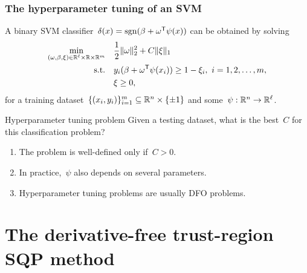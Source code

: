 \documentclass{polyu-presentation}  %
\begin{document}
\begin{frame}
    \frametitle{The hyperparameter tuning of an SVM}

    A \alert{binary SVM classifier}~$\delta(x) = \operatorname{sgn}(\beta + \omega^{\mathsf{T}} \psi(x))$ can be obtained by solving
    \begin{align*}
        \min_{(\omega, \beta, \xi) \in \mathbb{R}^{\ell} \times \mathbb{R} \times \mathbb{R}^m} & \quad\frac{1}{2} \lVert\omega\rVert_2^2 + C \lVert\xi\rVert_1\\
        \text{s.t.}                                                     & \quad y_i (\beta + \omega^{\mathsf{T}} \psi(x_i)) \ge 1 - \xi_i, ~ i = 1, 2, \dots, m,\\
                                                                        & \quad \xi \ge 0,
    \end{align*}
    for a \alert{training dataset}~$\{(x_i, y_i)\}_{i = 1}^m \subseteq \mathbb{R}^n \times \{\pm 1\}$ and some~$\psi : \mathbb{R}^n \to \mathbb{R}^{\ell}$.

    \medskip

    \begin{block}{Hyperparameter tuning problem}
        Given a \alert{testing dataset}, what is the \alert{best}~$C$ for this classification problem?
        \begin{enumerate}[<+(1)->]
            \item The problem is well-defined \alert{only if}~$C > 0$.
            \item In practice,~$\psi$ also depends on several \alert{parameters}.
            \item Hyperparameter tuning problems are usually \alert{DFO problems}.
        \end{enumerate}
    \end{block}
\end{frame}

\section{The derivative-free trust-region SQP method}

\end{document}

